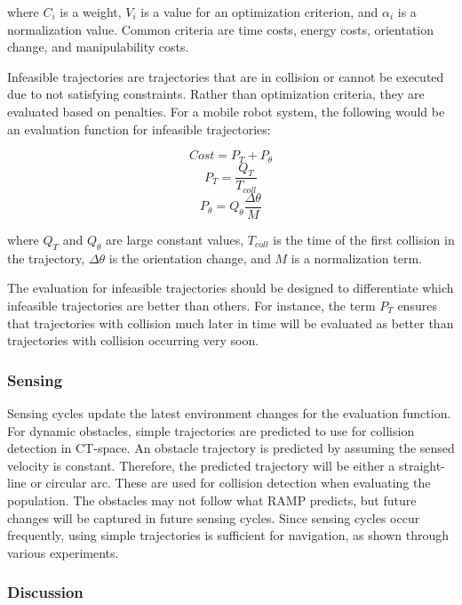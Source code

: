 \documentclass[10pt,conference]{ieeeconf}
\begin{document}
where $C_i$ is a weight, $V_i$ is a value for an optimization criterion, and $\alpha_i$ is a normalization value. Common criteria are time costs, energy costs, orientation change, and manipulability costs.

Infeasible trajectories are trajectories that are in collision or cannot be executed due to not satisfying constraints. Rather than optimization criteria, they are evaluated based on penalties. For a mobile robot system, the following would be an evaluation function for infeasible trajectories:

\begin{equation}
Cost = P_T + P_\theta
\end{equation}
\begin{equation}
P_T = \frac{Q_T}{T_{coll}}
\end{equation}
\begin{equation}
P_\theta = Q_\theta\frac{\Delta\theta}{M}
\end{equation}

where $Q_T$ and $Q_θ$ are large constant values, $T_{coll}$ is the time
of the first collision in the trajectory, $\Delta\theta$ is the orientation change, and $M$ is a normalization term.

The evaluation for infeasible trajectories should be designed to differentiate which infeasible trajectories are better than others. For instance, the term $P_T$ ensures that trajectories with collision much later in time will be evaluated as better than trajectories with collision occurring very soon.

\subsubsection{Sensing}

Sensing cycles update the latest environment changes for the evaluation function. For dynamic obstacles, simple trajectories are predicted to use for collision detection in CT-space. An obstacle trajectory is predicted by assuming the sensed velocity is constant. Therefore, the predicted trajectory will be either a straight-line or circular arc. These are used for collision detection when evaluating the population. The obstacles may not follow what RAMP predicts, but future changes will be captured in future sensing cycles. Since sensing cycles occur frequently, using simple trajectories is sufficient for navigation, as shown through various experiments.


\subsubsection{Discussion}
\end{document}
